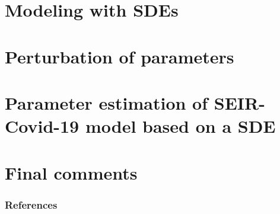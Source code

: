 \documentclass[9pt]{beamer}
\begin{document}
        \section{Modeling with SDEs}
             
        \section{Perturbation of parameters}
             
             
%
        \section{Parameter estimation of SEIR-Covid-19 model based on a SDE}
            
            
            
    \section{Final comments}
             
    \begin{frame}[allowframebreaks]
        \frametitle{References}
        
        
    \end{frame}
\end{document}

